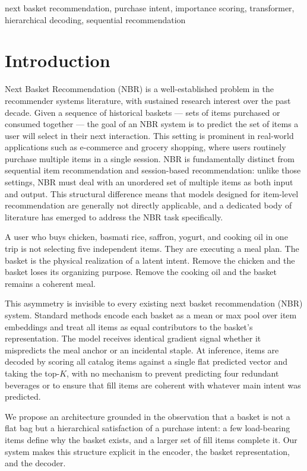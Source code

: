 \documentclass[conference]{IEEEtran}
\begin{document}
\begin{IEEEkeywords}
next basket recommendation, purchase intent, importance scoring,
transformer, hierarchical decoding, sequential recommendation
\end{IEEEkeywords}


\section{Introduction}
Next Basket Recommendation (NBR) is a well-established problem in the recommender systems literature, with sustained research interest over the past decade. Given a sequence of historical baskets — sets of items purchased or consumed together — the goal of an NBR system is to predict the set of items a user will select in their next interaction. This setting is prominent in real-world applications such as e-commerce and grocery shopping, where users routinely purchase multiple items in a single session.
NBR is fundamentally distinct from sequential item recommendation and session-based recommendation: unlike those settings, NBR must deal with an unordered set of multiple items as both input and output. This structural difference means that models designed for item-level recommendation are generally not directly applicable, and a dedicated body of literature has emerged to address the NBR task specifically.

A user who buys chicken, basmati rice, saffron, yogurt, and cooking oil
in one trip is not selecting five independent items. They are executing
a meal plan. The basket is the physical realization of a latent intent.
Remove the chicken and the basket loses its organizing purpose. Remove
the cooking oil and the basket remains a coherent meal.

This asymmetry is invisible to every existing next basket recommendation
(NBR) system. Standard methods encode each basket as a mean or max pool
over item embeddings and treat all items as equal contributors to the
basket's representation. The model receives identical gradient signal
whether it mispredicts the meal anchor or an incidental staple. At
inference, items are decoded by scoring all catalog items against a
single flat predicted vector and taking the top-$K$, with no mechanism
to prevent predicting four redundant beverages or to ensure that fill
items are coherent with whatever main intent was predicted.

We propose an architecture grounded in the observation that a basket is
not a flat bag but a hierarchical satisfaction of a purchase intent:
a few load-bearing items define why the basket exists, and a larger
set of fill items complete it. Our system makes this structure explicit
in the encoder, the basket representation, and the decoder.
\end{document}
